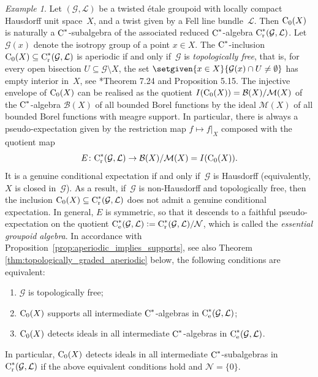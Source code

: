 \documentclass[a4paper]{amsart}
\theoremstyle{plain}
\theoremstyle{definition}
\theoremstyle{remark}
\newtheorem{example}[theorem]{Example}
\numberwithin{theorem}{section}
\numberwithin{equation}{section}
\newcommand*{\nb}{\nobreakdash}
\newcommand*{\red}{\mathrm{r}}%
\newcommand*{\ess}{\mathrm{e}}%
\newcommand*{\Cst}{\textup C^*}%
\newcommand*{\Cont}{\textup C}%
\renewcommand*{\L}{\mathcal L}%
\newcommand*{\defeq}{\mathrel{\vcentcolon=}}%
\newcommand*{\Gr}{\mathcal{G}}%
\begin{document}
\begin{example}
  \label{exm:twisted_groupoid}
  Let \((\Gr, \L)\)  be a  twisted \'etale groupoid with locally
  compact Hausdorff unit space~\(X\), and a twist given by a Fell line
  bundle~\(\L\).  Then \(\Cont_0(X)\) is naturally a \(\Cst\)\nb-subalgebra of the
   associated reduced \(\Cst\)\nb-algebra \(\Cst_\red(\Gr,
   \L)\).
    Let \(\Gr(x)\) denote the isotropy group of a point \(x\in X\).
  The  \(\Cst\)\nb-inclusion \(\Cont_0(X)\subseteq \Cst_{\red}(\Gr,
  \L)\) is aperiodic if and only if~\(\Gr\) is \emph{topologically
    free}, that is, for every open bisection \(U\subseteq \Gr\setminus
  X\), the set \(\setgiven{x\in X}{\Gr(x)\cap U\neq\emptyset}\) has
  empty interior in~\(X\), see \cite{Kwasniewski-Meyer:Essential}*{Theorem 7.24 and Proposition 5.15}.
  The injective envelope of \(\Cont_0(X)\) can be realised as the
  quotient \(I(\Cont_0(X))=\mathcal{B}(X)/\mathcal{M}(X)\) of
  the \(\Cst\)\nb-algebra \(\mathcal{B}(X)\) of all bounded Borel
  functions by the ideal \(\mathcal{M}(X)\) of all bounded Borel
  functions with meagre support.
  In particular, there is always a pseudo-expectation given by
  the restriction map \(f\mapsto f|_X\) composed with the quotient map
  \[
    E\colon \Cst_{\red}(\Gr, \L)\to \mathcal{B}(X)/\mathcal{M}(X)
    = I(\Cont_0(X)).
  \]
  It  is a genuine conditional expectation if and only if~\(\Gr\) is
  Hausdorff (equivalently, \(X\) is closed in~\(\Gr\)).
  As a result, if~\(\Gr\) is non-Hausdorff and topologically free,
  then the inclusion \(\Cont_0(X)\subseteq \Cst_\red(\Gr, \L)\) does
  not admit a genuine conditional expectation.
  In general, \(E\) is symmetric, so that it descends to a faithful
  pseudo-expectation on the quotient \(\Cst_\ess(\Gr,\L)\defeq
  \Cst_\red(\Gr, \L)/\mathcal{N}\), which is called the
  \emph{essential groupoid algebra}.
  In accordance with
  Proposition~\ref{prop:aperiodic_implies_supports}, see also Theorem
  \ref{thm:topologically_graded_aperiodic} below, the following
  conditions are equivalent:
  \begin{enumerate}
  \item \(\Gr\) is topologically free;
  \item \(\Cont_0(X)\) supports all intermediate \(\Cst\)\nb-algebras
    in \(\Cst_\ess(\Gr, \L)\);
  \item \(\Cont_0(X)\) detects ideals in all intermediate
    \(\Cst\)\nb-algebras in \(\Cst_\ess(\Gr, \L)\).
  \end{enumerate}
  In particular,  \(\Cont_0(X)\) detects ideals in all intermediate
  \(\Cst\)\nb-subalgebras in \(\Cst_\red(\Gr, \L)\) if the above
  equivalent conditions hold and \(\mathcal{N}=\{0\}\).
\end{example}
\end{document}
